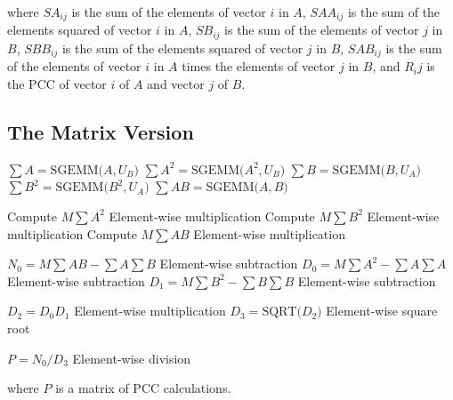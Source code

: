 \documentclass{bioinfo}
\begin{document}
\vspace{2mm}

\noindent where $SA_{ij}$ is the sum of the elements of vector $i$ in $A$, 
$SAA_{ij}$ is the sum of the elements squared of vector $i$ in $A$, 
$SB_{ij}$ is the sum of the elements of vector $j$ in $B$, 
$SBB_{ij}$ is the sum of the elements squared of vector $j$ in $B$, 
$SAB_{ij}$ is the sum of the elements of vector $i$ in $A$ times the  elements of vector $j$ in $B$, 
and $R_ij$ is the PCC of vector $i$ of $A$ and vector $j$ of $B$.

\subsection{The Matrix Version}
  
\vspace{2mm}

\begin{algorithmic}[0]

  \STATE $\sum A=\text{SGEMM(}A,U_B\text{)}$
  \STATE $\sum A^2=\text{SGEMM(}A^2,U_B\text{)}$
  \STATE $\sum B=\text{SGEMM(}B,U_A\text{)}$
  \STATE $\sum B^2=\text{SGEMM(}B^2,U_A\text{)}$
  \STATE $\sum AB=\text{SGEMM(}A,B\text{)}$
  
  \vspace{2mm}

  \STATE Compute $M\sum A^2$ Element-wise multiplication
  \STATE Compute $M\sum B^2$ Element-wise multiplication
  \STATE Compute $M\sum AB$ Element-wise multiplication
  
  \vspace{2mm}

  \STATE $N_0=M\sum AB - \sum A\sum B$ Element-wise subtraction
  \STATE $D_0=M\sum A^2 - \sum A\sum A$ Element-wise subtraction
  \STATE $D_1=M\sum B^2 - \sum B\sum B$ Element-wise subtraction

  \vspace{2mm}

  \STATE $D_2=D_0 D_1 $ Element-wise multiplication
  \STATE $D_3=\text{SQRT(}D_2\text{)}$ Element-wise square root

  \vspace{2mm}

  \STATE $P=N_0 / D_3$ Element-wise division
  
\end{algorithmic}

\vspace{2mm}

\noindent where $P$ is a matrix of PCC calculations.
\end{document}
